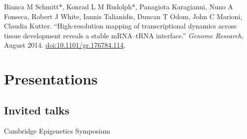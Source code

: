 \documentclass{klmr-cv}
\begin{document}

\begin{enumerate}
    \listitem Bianca M Schmitt*, Konrad L M Rudolph*, Panagiota Karagianni,
        Nuno A Fonseca, Robert J White, Iannis Talianidis, Duncan T Odom,
        John C Marioni, Claudia Kutter. “High-resolution mapping of
        transcriptional dynamics across tissue development reveals a stable
        mRNA--tRNA interface.” \textit{Genome Research}, August 2014.
        \href{http://dx.doi.org/10.1101/gr.176784.114}{doi:10.1101/gr.176784.114}.
\end{enumerate}

\section{Presentations}

\subsection{Invited talks}

\date{2014}
\item{Cambridge Epigenetics Symposium}
\end{document}
